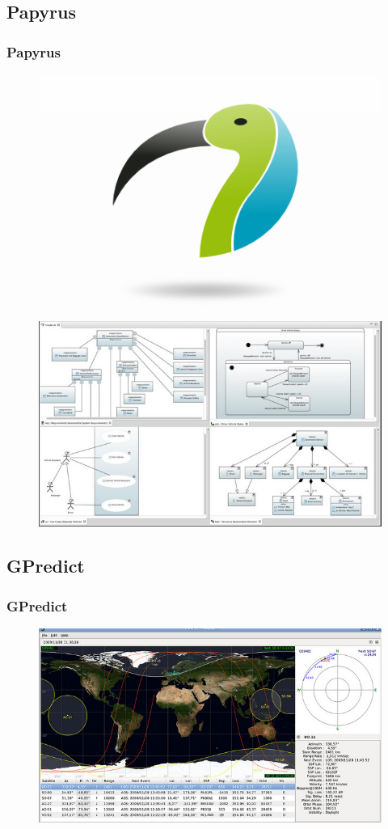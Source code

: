 \documentclass[spanish]{beamer}
\begin{document}
\subsection{Papyrus}
\begin{frame}
	\frametitle{Papyrus}
	\begin{figure}
		\centering
		\includegraphics[width=0.3\linewidth]{../Resumen/papyrus}
	\end{figure}
	\begin{figure}
		\centering
		\includegraphics[width=0.6\linewidth]{../Resumen/papyrus2}
	\end{figure}
\end{frame}

\subsection{GPredict}
\begin{frame}
	\frametitle{GPredict}
\begin{figure}
	\centering
	\includegraphics[width=1\linewidth]{../Resumen/gpredict}
\end{figure}
\end{frame}
\end{document}
